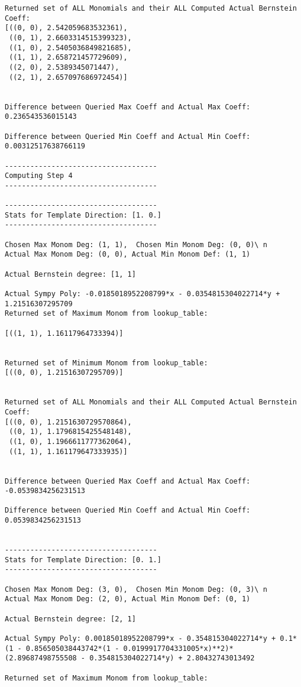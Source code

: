 \begin{verbatim}
Returned set of ALL Monomials and their ALL Computed Actual Bernstein Coeff:
[((0, 0), 2.542059683532361),
 ((0, 1), 2.6603314515399323),
 ((1, 0), 2.5405036849821685),
 ((1, 1), 2.658721457729609),
 ((2, 0), 2.5389345071447),
 ((2, 1), 2.657097686972454)]


Difference between Queried Max Coeff and Actual Max Coeff: 0.236543536015143

Difference between Queried Min Coeff and Actual Min Coeff: 0.00312517638766119

------------------------------------
Computing Step 4
------------------------------------

------------------------------------
Stats for Template Direction: [1. 0.]
------------------------------------

Chosen Max Monom Deg: (1, 1),  Chosen Min Monom Deg: (0, 0)\ n
Actual Max Monom Deg: (0, 0), Actual Min Monom Def: (1, 1)

Actual Bernstein degree: [1, 1]

Actual Sympy Poly: -0.0185018952208799*x - 0.0354815304022714*y + 1.21516307295709
Returned set of Maximum Monom from lookup_table:

[((1, 1), 1.16117964733394)]


Returned set of Minimum Monom from lookup_table:
[((0, 0), 1.21516307295709)]


Returned set of ALL Monomials and their ALL Computed Actual Bernstein Coeff:
[((0, 0), 1.2151630729570864),
 ((0, 1), 1.1796815425548148),
 ((1, 0), 1.1966611777362064),
 ((1, 1), 1.161179647333935)]


Difference between Queried Max Coeff and Actual Max Coeff: -0.0539834256231513

Difference between Queried Min Coeff and Actual Min Coeff: 0.0539834256231513


------------------------------------
Stats for Template Direction: [0. 1.]
------------------------------------

Chosen Max Monom Deg: (3, 0),  Chosen Min Monom Deg: (0, 3)\ n
Actual Max Monom Deg: (2, 0), Actual Min Monom Def: (0, 1)

Actual Bernstein degree: [2, 1]

Actual Sympy Poly: 0.00185018952208799*x - 0.354815304022714*y + 0.1*(1 - 0.856505038443742*(1 - 0.0199917704331005*x)**2)*(2.89687498755508 - 0.354815304022714*y) + 2.80432743013492

Returned set of Maximum Monom from lookup_table:


\end{verbatim}
